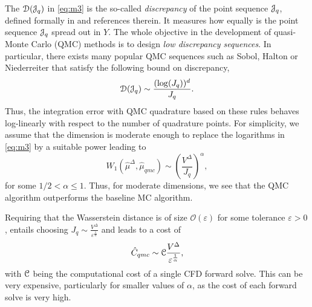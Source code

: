 \documentclass[a4paper]{article}
\numberwithin{equation}{section}
\numberwithin{equation}{section}
\theoremstyle{definition}
\theoremstyle{myremarkstyle}
\renewcommand{\leq}{\leqslant}
\renewcommand{\epsilon}{\varepsilon}
\newcommand{\cO}{{\mathcal O}}
\newcommand{\cost}{\EuScript{C}}
\newcommand{\Jq}{\EuScript{J}_q}
\newcommand{\Ds}{\EuScript{D}}
\begin{document}
The $\Ds(\Jq)$ in \eqref{eq:m3} is the so-called \emph{discrepancy} of the point sequence $\Jq$, defined formally in \cite{CAF1} and references therein. It measures how equally is the point sequence $\Jq$ spread out in $Y$. The whole objective in the development of quasi-Monte Carlo (QMC) methods is to design \emph{low discrepancy sequences}. In particular, there exists many popular QMC sequences such as Sobol, Halton or Niederreiter \cite{CAF1} that satisfy the following bound on discrepancy,
\begin{equation}
\label{eq:lds}
  \Ds(\Jq) \sim \frac{(\log(J_q))^{d}}{J_q}.
  \end{equation}
  Thus, the integration error with QMC quadrature based on these rules behaves log-linearly with respect to the number of quadrature points. For simplicity, we assume that the dimension is moderate enough to replace the logarithms in \eqref{eq:m3} by a suitable power leading to 
  \begin{equation}
\label{eq:m2}
W_1\left(\hat{\mu}^{\Delta}, \hat{\mu}_{qmc} \right) \sim \left(\frac{V^{\Delta}}{J_q}\right)^{\alpha},
\end{equation}
for some $1/2 < \alpha \leq 1$. Thus, for moderate dimensions, we see that the QMC algorithm outperforms the baseline MC algorithm. 

Requiring that the Wasserstein distance is of size $\cO(\epsilon)$ for some tolerance $\epsilon > 0$, entails choosing $J_q \sim \frac{V^{\Delta}}{\epsilon^{\frac{1}{\alpha}}}$ and leads to a cost of 
\begin{equation}
\label{eq:cqmc1}
\hat{C}_{qmc} \sim \cost \frac{V^{\Delta}}{\epsilon^{\frac{1}{\alpha}}},
\end{equation}
with $\cost$ being the computational cost of a single CFD forward solve. This can be very expensive, particularly for smaller values of $\alpha$, as the cost of each forward solve is very high.
\end{document}
